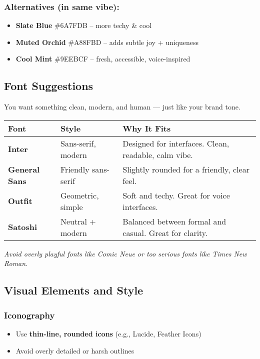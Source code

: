 \subsubsection{Alternatives (in same vibe):}
\begin{itemize}
    \item \textbf{Slate Blue} \#6A7FDB – more techy \& cool
    \item \textbf{Muted Orchid} \#A88FBD – adds subtle joy + uniqueness
    \item \textbf{Cool Mint} \#9EEBCF – fresh, accessible, voice-inspired
\end{itemize}


\subsection{Font Suggestions}
You want something clean, modern, and human — just like your brand tone.
\begin{tabular}{|l|l|l|}
\hline
\textbf{Font} & \textbf{Style} & \textbf{Why It Fits} \\
\hline
\textbf{Inter} & Sans-serif, modern & Designed for interfaces. Clean, readable, calm vibe. \\
\hline
\textbf{General Sans} & Friendly sans-serif & Slightly rounded for a friendly, clear feel. \\
\hline
\textbf{Outfit} & Geometric, simple & Soft and techy. Great for voice interfaces. \\
\hline
\textbf{Satoshi} & Neutral + modern & Balanced between formal and casual. Great for clarity. \\
\hline
\end{tabular}

\textit{Avoid overly playful fonts like Comic Neue or too serious fonts like Times New Roman.}

\subsection{Visual Elements and Style}

\subsubsection{Iconography}
\begin{itemize}
    \item Use \textbf{thin-line, rounded icons} (e.g., Lucide, Feather Icons)
    \item Avoid overly detailed or harsh outlines
\end{itemize}

